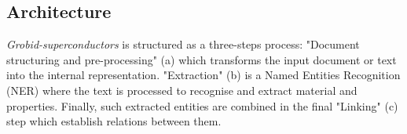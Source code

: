 \documentclass{article}
\begin{document}



\subsection{Architecture}

\textit{Grobid-superconductors} is structured as a three-steps process:  "Document structuring and pre-processing" (a) which transforms the input document or text into the internal representation. "Extraction" (b) is a Named Entities Recognition (NER) where the text is processed to recognise and extract material and properties. Finally, such extracted entities are combined in the final "Linking" (c) step which establish relations between them. 
\end{document}

